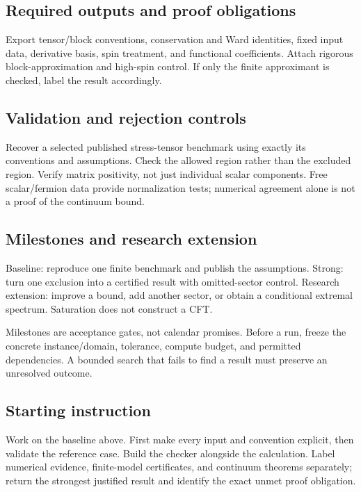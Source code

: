 \documentclass[
  11pt,
]{article}
\begin{document}
\subsection{Required outputs and proof obligations}

Export tensor/block conventions, conservation and Ward identities, fixed
input data, derivative basis, spin treatment, and functional
coefficients. Attach rigorous block-approximation and high-spin control.
If only the finite approximant is checked, label the result accordingly.

\subsection{Validation and rejection controls}

Recover a selected published stress-tensor benchmark using exactly its
conventions and assumptions. Check the allowed region rather than the
excluded region. Verify matrix positivity, not just individual scalar
components. Free scalar/fermion data provide normalization tests;
numerical agreement alone is not a proof of the continuum bound.

\subsection{Milestones and research extension}

Baseline: reproduce one finite benchmark and publish the assumptions.
Strong: turn one exclusion into a certified result with omitted-sector
control. Research extension: improve a bound, add another sector, or
obtain a conditional extremal spectrum. Saturation does not construct a
CFT.

Milestones are acceptance gates, not calendar promises. Before a run,
freeze the concrete instance/domain, tolerance, compute budget, and
permitted dependencies. A bounded search that fails to find a result
must preserve an unresolved outcome.

\subsection{Starting instruction}

Work on the baseline above. First make every input and convention
explicit, then validate the reference case. Build the checker alongside
the calculation. Label numerical evidence, finite-model certificates,
and continuum theorems separately; return the strongest justified result
and identify the exact unmet proof obligation.
\end{document}
